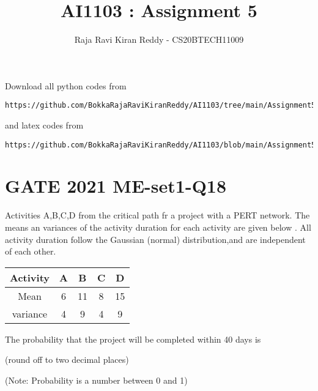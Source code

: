 \documentclass[journal,12pt,twocolumn]{IEEEtran}
\begin{document}
\let\vec\mathbf
\renewcommand{\thefigure}{\theproblem}
\def\putbox#1#2#3{\makebox[0in][l]{\makebox[#1][l]{}\raisebox{\baselineskip}[0in][0in]{\raisebox{#2}[0in][0in]{#3}}}}
     \def\rightbox#1{\makebox[0in][r]{#1}}
     \def\centbox#1{\makebox[0in]{#1}}
     \def\topbox#1{\raisebox{-\baselineskip}[0in][0in]{#1}}
     \def\midbox#1{\raisebox{-0.5\baselineskip}[0in][0in]{#1}}
\vspace{3cm}
\title{AI1103 : Assignment 5}
\author{Raja Ravi Kiran Reddy - CS20BTECH11009}
\maketitle
\newpage
\bigskip
\renewcommand{\thefigure}{\arabic{figure}}
\renewcommand{\thetable}{\arabic{table}}
Download all python codes from 
\begin{lstlisting}
https://github.com/BokkaRajaRaviKiranReddy/AI1103/tree/main/Assignment5/codes
\end{lstlisting}
%
and latex codes from 
%
\begin{lstlisting}
https://github.com/BokkaRajaRaviKiranReddy/AI1103/blob/main/Assignment5/Assignment5.tex
\end{lstlisting}
\section*{GATE 2021 ME-set1-Q18}
Activities A,B,C,D from the critical path fr a project with a PERT network. The means an variances of the activity duration for each activity are given below . All activity duration follow the Gaussian (normal) distribution,and are independent of each other.

\begin{table}[h!]
\centering
\begin{tabular}{|c||c|c|c|c|}
    \hline
    Activity & A& B& C& D \\
    \hline
    Mean & 6& 11& 8& 15\\[1ex]
    \hline
    variance & 4& 9& 4& 9\\[1ex]
    \hline
\end{tabular}
\end{table}
The probability that the project will be completed within 40 days is  

(round off to two decimal places)

(Note: Probability is a number between 0 and 1)
\end{document}
